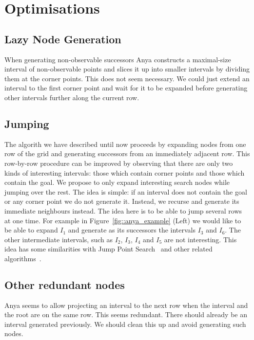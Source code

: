 \section{Optimisations}
\label{sec::optimisations}

\subsection{Lazy Node Generation}
When generating non-observable successors Anya constructs a maximal-size
interval of non-observable points and slices it up into smaller intervals
by dividing them at the corner points. This does not seem necessary.
We could just extend an interval to the first corner point and wait
for it to be expanded before generating other intervals further along
the current row. 


\subsection{Jumping}
The algorith we have described until now proceeds by expanding nodes
from one row of the grid and generating successors from an immediately
adjacent row. This row-by-row procedure can be improved by observing
that there are only two kinds of interesting intervals:
those which contain corner points and those which contain the goal.
We propose to only expand interesting search nodes while jumping
over the rest. The idea is simple:
if an interval does not contain the goal or any corner point we
do not generate it. Instead, we recurse and generate its immediate
neighbours instead. The idea here is to be able to jump several
rows at one time. For example in Figure~\ref{fig::anya_example} (Left)
we would like to be able to expand $I_1$ and generate as its successors
the intervals $I_3$ and $I_6$. The other intermediate intervals, such
as $I_2$, $I_3$, $I_4$ and $I_5$ are not interesting.
This idea has some similarities with Jump Point Search~\cite{harabor11b}
and other related algorithms~\cite{haraborG14}.

\subsection{Other redundant nodes}
Anya seems to allow projecting an interval to the next row when the interval and the root are
on the same row. This seems redundant. There should already be an interval generated previously.
We should clean this up and avoid generating such nodes.

